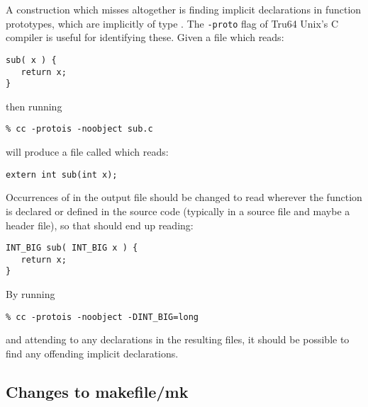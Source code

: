 \documentclass[twoside,11pt]{article}
\renewcommand{\_}{\texttt{\symbol{95}}}
\begin{document}
A construction which  misses altogether is finding
implicit declarations in function prototypes, which are implicitly
of type .
The {\tt -proto} flag of Tru64 Unix's C compiler is useful for identifying
these.
Given a file  which reads:
\begin{squote}
\begin{verbatim}
sub( x ) {
   return x;
}
\end{verbatim}
\end{squote}
then running
\begin{squote}
\begin{verbatim}
% cc -protois -noobject sub.c
\end{verbatim}
\end{squote}
will produce a file called  which reads:
\begin{squote}
\begin{verbatim}
extern int sub(int x);
\end{verbatim}
\end{squote}
Occurrences of  in the output file  should be 
changed to read \cc{INT\_BIG} wherever the function is declared or
defined in the source code (typically in a source file and maybe a 
header file), so that  should
end up reading:
\begin{squote}
\begin{verbatim}
INT_BIG sub( INT_BIG x ) {
   return x;
}
\end{verbatim}
\end{squote}
By running
\begin{squote}
\begin{verbatim}
% cc -protois -noobject -DINT_BIG=long
\end{verbatim}
\end{squote}
and attending to any  declarations in the resulting  files,
it should be possible to find any offending implicit declarations.


\subsection{Changes to makefile/mk\label{sec:makefile}}
\end{document}

